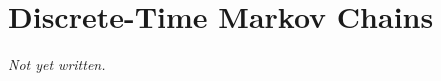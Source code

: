 \chapter{Discrete-Time Markov Chains}\label{ch:discrete-time-markov-chains}


\textit{Not yet written.}
